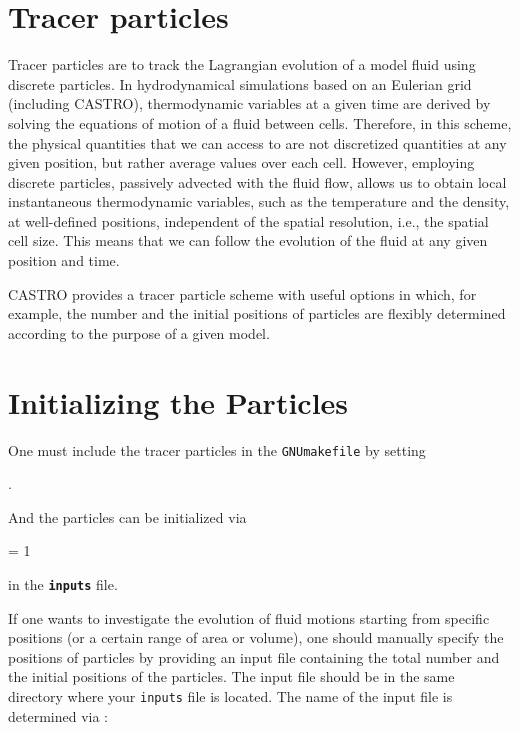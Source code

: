 \section{Tracer particles}

Tracer particles are to track the Lagrangian evolution of a model fluid using discrete particles. In hydrodynamical simulations based on an Eulerian grid (including CASTRO), thermodynamic variables at a given time are derived by solving the equations of motion of a fluid between cells. Therefore, in this scheme, the physical quantities that we can access to are not discretized quantities at any given position, but rather average values over each cell. However, employing discrete particles, passively advected with the fluid flow, allows us to obtain local instantaneous thermodynamic variables, such as the temperature and the density, at well-defined positions, independent of the spatial resolution, i.e., the spatial cell size. This means that we can follow the evolution of the fluid at any given position and time. 

\noindent CASTRO provides a tracer particle scheme with useful options in which, for example, the number and the initial positions of particles are flexibly determined according to the purpose of a given model. 


\section{Initializing the Particles}

One must include the tracer particles in the {\tt GNUmakefile} by setting

\vspace{0.1in}
.
\vspace{0.1in}

\noindent And the particles can be initialized via

\vspace{0.1in}
     = 1
\vspace{0.1in}

\noindent in the {\tt {\bf inputs}} file.

If one wants to investigate the evolution of fluid motions starting from specific positions (or a certain range of area or volume), one should manually specify the positions of particles by providing an input file containing the total number and the initial positions of the particles.  
The input file should be in the same directory where your {\tt inputs} file is located. The name of the input file is  determined via :


